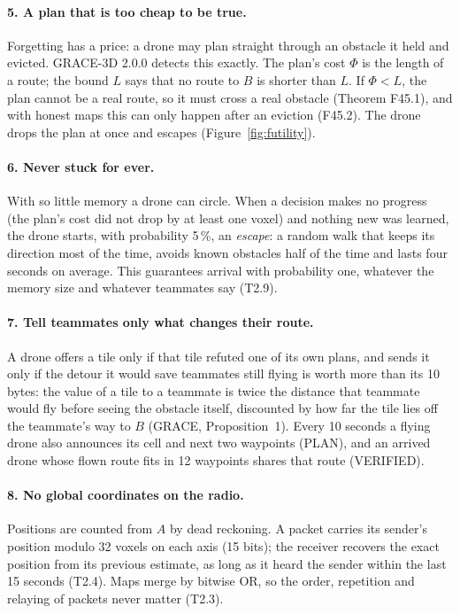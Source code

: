 \documentclass[11pt,a4paper]{article}
\begin{document}
\paragraph{5. A plan that is too cheap to be true.} Forgetting has a price: a drone may plan straight through an
obstacle it held and evicted. GRACE-3D 2.0.0 detects this exactly. The plan's cost $\Phi$ is the length of a route;
the bound $L$ says that no route to $B$ is shorter than $L$. If $\Phi<L$, the plan cannot be a real route, so it must
cross a real obstacle (Theorem F45.1), and with honest maps this can only happen after an eviction (F45.2). The drone
drops the plan at once and escapes (Figure~\ref{fig:futility}).

\paragraph{6. Never stuck for ever.} With so little memory a drone can circle. When a decision makes no progress (the
plan's cost did not drop by at least one voxel) and nothing new was learned, the drone starts, with probability 5\,\%,
an \emph{escape}: a random walk that keeps its direction most of the time, avoids known obstacles half of the time and
lasts four seconds on average. This guarantees arrival with probability one, whatever the memory size and whatever
teammates say (T2.9).

\paragraph{7. Tell teammates only what changes their route.} A drone offers a tile only if that tile refuted one of its
own plans, and sends it only if the detour it would save teammates still flying is worth more than its 10 bytes: the
value of a tile to a teammate is twice the distance that teammate would fly before seeing the obstacle itself,
discounted by how far the tile lies off the teammate's way to $B$ (GRACE, Proposition~1). Every 10 seconds a flying
drone also announces its cell and next two waypoints (PLAN), and an arrived drone whose flown route fits in 12 waypoints
shares that route (VERIFIED).

\paragraph{8. No global coordinates on the radio.} Positions are counted from $A$ by dead reckoning. A packet carries its
sender's position modulo 32 voxels on each axis (15 bits); the receiver recovers the exact position from its previous
estimate, as long as it heard the sender within the last 15 seconds (T2.4). Maps merge by bitwise OR, so the order,
repetition and relaying of packets never matter (T2.3).
\end{document}
